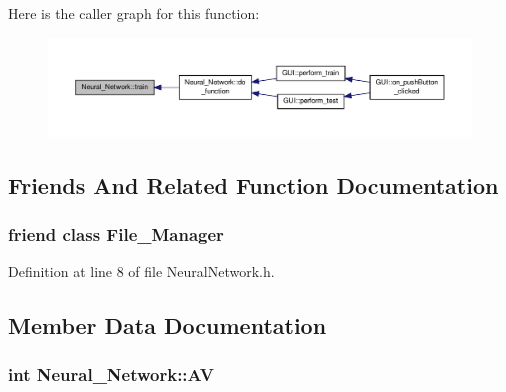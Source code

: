 Here is the caller graph for this function\-:\nopagebreak
\begin{figure}[H]
\begin{center}
\leavevmode
\includegraphics[width=350pt]{d1/d7c/a00003_a033f4f60812c0359cc50815e957f11f7_icgraph}
\end{center}
\end{figure}




\subsection{Friends And Related Function Documentation}
\hypertarget{a00003_a96aa84fcda6b19a74fff9d19c16b07fe}{
\subsubsection[{File\-\_\-\-Manager}]{\setlength{\rightskip}{0pt plus 5cm}friend class {\bf File\-\_\-\-Manager}\hspace{0.3cm}{\ttfamily [friend]}}}\label{d1/d7c/a00003_a96aa84fcda6b19a74fff9d19c16b07fe}


Definition at line 8 of file Neural\-Network.\-h.



\subsection{Member Data Documentation}
\hypertarget{a00003_a970136042929b26220d35be2776220a6}{
\subsubsection[{A\-V}]{\setlength{\rightskip}{0pt plus 5cm}int Neural\-\_\-\-Network\-::\-A\-V\hspace{0.3cm}{\ttfamily [private]}}}\label{d1/d7c/a00003_a970136042929b26220d35be2776220a6}


